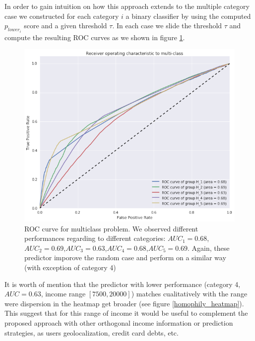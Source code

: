 In order to gain intuition on how this approach extends to the multiple category case we constructed for each category $i$ a binary classifier by using the computed $p_{lower_{i}}$ score and a given threshold $\tau$. In each case we slide the threshold $\tau$ and compute the resulting ROC curves as we shown in figure \ref{roc_multiple_categories}.

\begin{figure}
\includegraphics[width=\columnwidth]{figures/ROC_multiclass/ROC_multiclass.png}
\caption{ROC curve for multiclass problem. We observed different performances regarding to different categories: $AUC_1=0.68$, $AUC_2=0.69$,$AUC_3=0.63$,$AUC_4=0.68$,$AUC_5=0.69$. Again, these predictor imporove the random case and perform on a similar way (with exception of category 4)}
\label{roc_multiple_categories}
\end{figure}

It is worth of mention that the predictor with lower performance (category 4,$AUC=0.63$, income range $[7500,20000]$) matches cualitatively with the range were dispersion in the heatmap get broader (see figure \ref{homophily_heatmap}). This suggest that for this range of income it would be useful to complement the proposed approach with other orthogonal income information or prediction strategies, as users geolocalization, credit card debts, etc.  
